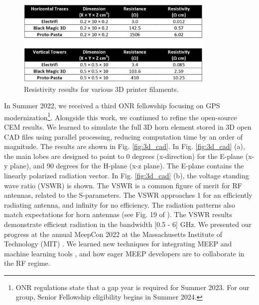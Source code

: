 \documentclass[10pt]{amsart}
\theoremstyle{definition}
\numberwithin{equation}{section}
\begin{document}
\begin{figure}[ht]
\centering
\includegraphics[width=0.85\textwidth,trim=0cm 0cm 0cm 7cm,clip=true]{figures/multi3dllc.png}
\caption{\label{fig:3d_print2} Resistivity results for various 3D printer filaments.}
\end{figure}

In Summer 2022, we received a third ONR fellowship focusing on GPS modernization\footnote{ONR regulations state that a gap year is required for Summer 2023.  For our group, Senior Fellowship eligibility begins in Summer 2024.}.  Alongside this work, we continued to refine the open-source CEM results.  We learned to simulate the full 3D horn element stored in 3D open CAD files using parallel processing, reducing computation time by an order of magnitude.  The results are shown in Fig. \ref{fig:3d_cad}.  In Fig. \ref{fig:3d_cad} (a), the main lobes are designed to point to 0 degrees (x-direction) for the E-plane (x-y plane), and 90 degrees for the H-plane (x-z plane).  The E-plane contains the linearly polarized radiation vector.  In Fig. \ref{fig:3d_cad} (b), the voltage standing wave ratio (VSWR) is shown.  The VSWR is a common figure of merit for RF antennas, related to the S-parameters.  The VSWR approaches 1 for an efficiently radiating antenna, and infinity for no efficiency.  The radiation patterns also match expectations for horn antennas (see Fig. 19 of \cite{8786183}).  The VSWR results demonstrate efficient radiation in the bandwidth [0.5 - 6] GHz.  We presented our progress at the annual MeepCon 2022 at the Massachusetts Institute of Technology (MIT) \cite{meepcon2022}.  We learned new techniques for integrating MEEP and machine learning tools \cite{meepcon2022_2}, and how eager MEEP developers are to collaborate in the RF regime.  
\end{document}
